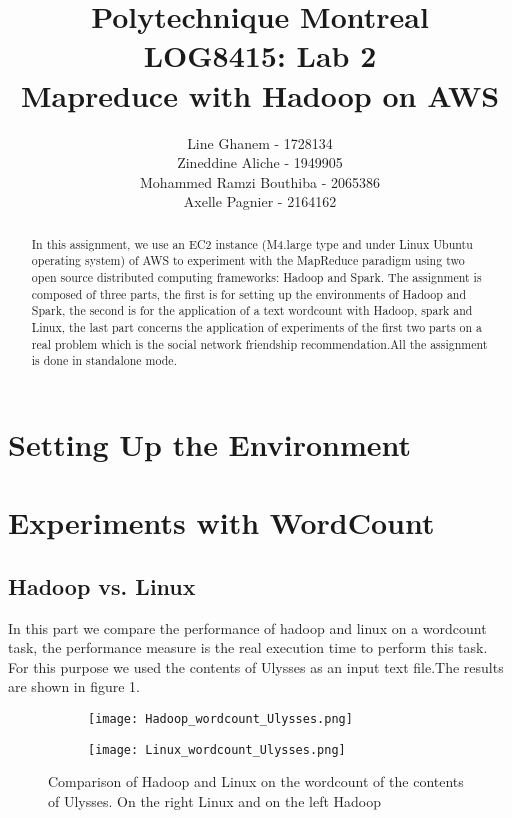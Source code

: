 \documentclass[12pt]{article}
\title{Polytechnique Montreal \\
LOG8415: Lab 2\\
Mapreduce with Hadoop on AWS}
\author{Line Ghanem - 1728134\\Zineddine Aliche - 1949905\\
Mohammed Ramzi Bouthiba - 2065386\\Axelle Pagnier - 2164162}
\begin{document}
\maketitle

\begin{abstract}
In this assignment, we use an EC2 instance (M4.large type and under Linux Ubuntu operating system) of AWS to experiment with the MapReduce paradigm using two open source distributed computing frameworks: Hadoop and Spark. The assignment is composed of three parts, the first is for setting up the environments of Hadoop and Spark, the second is for the application of a text wordcount with Hadoop, spark and Linux, the last part concerns the application of experiments of the first two parts on a real problem which is the social network friendship recommendation.All the assignment is done in standalone mode.
\end{abstract}

\section{Setting Up the Environment}


\section{Experiments with WordCount}
\subsection{Hadoop vs. Linux}
In this part we compare the performance of hadoop and linux on a wordcount task, the performance measure is the real execution time to perform this task. For this purpose we used the contents of Ulysses as an input text file.The results are shown in figure 1.
\begin{figure}[h]
    
     \begin{subfigure}[b]{0.41\textwidth}
         
         \texttt{[image: Hadoop\_wordcount\_Ulysses.png]}
         
     \end{subfigure}
     \hfill
     \begin{subfigure}[b]{0.41\textwidth}
         
         \texttt{[image: Linux\_wordcount\_Ulysses.png]}
         
     \end{subfigure}
     \hfill
        \centering
        \caption{Comparison of Hadoop and Linux on the wordcount of the contents of Ulysses. On the right Linux and on the left Hadoop}
        \label{fig:three graphs}
\end{figure}
\end{document}
